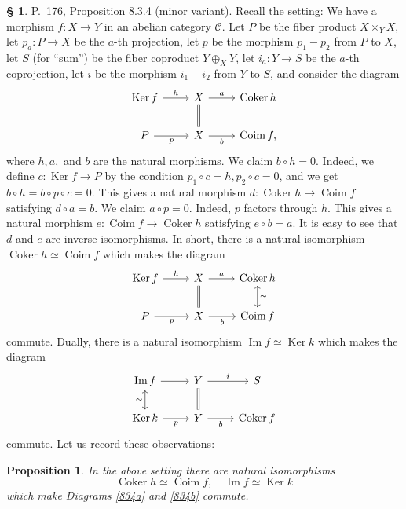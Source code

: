 \documentclass[12pt]{article}
\newtheorem{prop}[thm]{Proposition}
\theoremstyle{remark}
\theoremstyle{definition}
\newtheorem{s}[thm]{\S}
\newcommand{\C}{\mathcal C}
\newcommand{\mv}{ (minor variant)}
\DeclareMathOperator{\Coim}{Coim}
\DeclareMathOperator{\Coker}{Coker}
\DeclareMathOperator{\Ima}{Im}
\DeclareMathOperator{\Ker}{Ker}
\begin{document}
\begin{s}%
P.~176, Proposition 8.3.4\mv. Recall the setting: We have a morphism $f:X\to Y$ in an abelian category $\C$. Let $P$ be the fiber product $X\times_YX$, let $p_a:P\to X$ be the $a$-th projection, let $p$ be the morphism $p_1-p_2$ from $P$ to $X$, let $S$ (for ``sum'') be the fiber coproduct $Y\oplus_XY$,  let $i_a:Y\to S$ be the $a$-th coprojection, let $i$ be the morphism $i_1-i_2$ from $Y$ to $S$, and consider the diagram 
%
$$
\begin{tikzcd}
\Ker f\ar{r}{h}&X\ar[equal]{d}\ar{r}{a}&\Coker h\\ 
P\ar{r}[swap]{p}&X\ar{r}[swap]{b}&\Coim f,
\end{tikzcd}
$$ 
where $h,a,$ and $b$ are the natural morphisms. We claim $b\circ h=0$. Indeed, we define $c:\Ker f\to P$ by the condition $p_1\circ c=h,p_2\circ c=0$, and we get $b\circ h=b\circ p\circ c=0$. This gives a natural morphism $d:\Coker h\to\Coim f$ satisfying $d\circ a=b$. We claim $a\circ p=0$. Indeed, $p$ factors through $h$. This gives a natural morphism $e:\Coim f\to\Coker h$ satisfying $e\circ b=a$. It is easy to see that $d$ and $e$ are inverse isomorphisms. In short, there is a natural isomorphism $\Coker h\simeq\Coim f$ which makes the diagram 
\begin{equation}\label{834a}
\begin{tikzcd}
\Ker f\ar{r}{h}&X\ar[equal]{d}\ar{r}{a}&\Coker h\ar[leftrightarrow]{d}{\sim}\\ 
P\ar{r}[swap]{p}&X\ar{r}[swap]{b}&\Coim f
\end{tikzcd}
\end{equation}
commute. Dually, there is a natural isomorphism $\Ima f\simeq\Ker k$ which makes the diagram 
\begin{equation}\label{834b}
\begin{tikzcd}
\Ima f\ar[leftrightarrow]{d}[swap]{\sim}\ar{r}&Y\ar[equal]{d}\ar{r}{i}&S\\ 
\Ker k\ar{r}[swap]{p}&Y\ar{r}[swap]{b}&\Coker f
\end{tikzcd}
\end{equation}
commute. Let us record these observations:
\begin{prop}\label{p834}
In the above setting there are natural isomorphisms 
$$
\Coker h\simeq\Coim f,\quad\Ima f\simeq\Ker k
$$ 
which make Diagrams \eqref{834a} and \eqref{834b} commute.
\end{prop}
\end{s}
%
%
\end{document}
